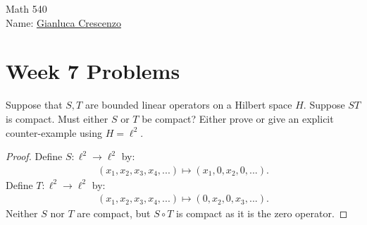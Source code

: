 \documentclass[10pt,oneside,openany]{memoir}
\begin{document}
\begin{center}
    {\large Math 540 }\\[.175in]
    {Name:} {\underline{Gianluca Crescenzo\hspace*{2in}}}\\[0.15in]
    \end{center}
    \vspace{4pt}
\section*{Week 7 Problems}
\begin{exercise}[manual-num={1}]
Suppose that $S,T$ are bounded linear operators on a Hilbert space $H$. Suppose $ST$ is compact. Must either $S$ or $T$ be compact? Either prove or give an explicit counter-example using $H = \ell^2$.
\end{exercise}
    \begin{proof}
        Define $S:\ell^2 \rightarrow \ell^2$ by:
            \begin{equation*}
            \begin{split}
                (x_1,x_2,x_3,x_4,...) \mapsto (x_1,0,x_2,0,...).
            \end{split}
            \end{equation*}
        Define $T:\ell^2 \rightarrow \ell^2$ by:
            \begin{equation*}
            \begin{split}
                (x_1,x_2,x_3,x_4,...) \mapsto (0,x_2,0,x_3,...).
            \end{split}
            \end{equation*}
        Neither $S$ nor $T$ are compact, but $S \circ T$ is compact as it is the zero operator.
    \end{proof}
\end{document}
